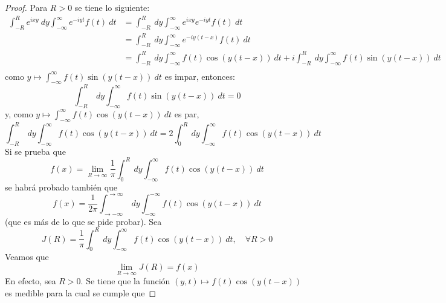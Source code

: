 \documentclass[12pt]{report}
\theoremstyle{largebreak}
\begin{document}
    \begin{proof}
        Para $R>0$ se tiene lo siguiente:
        \begin{equation*}
            \begin{split}
                \int_{ -R}^{ R}e^{ixy}\:dy\int_{-\infty}^\infty e^{ -iyt}f(t)\:dt&=\int_{ -R}^{ R}\:dy\int_{-\infty}^\infty e^{ixy}e^{ -iyt}f(t)\:dt\\
                &=\int_{ -R}^{ R}\:dy\int_{-\infty}^\infty e^{ -iy(t-x)}f(t)\:dt\\
                &=\int_{ -R}^{ R}\:dy\int_{-\infty}^\infty f(t)\cos(y(t-x))\:dt+i\int_{ -R}^{ R}\:dy\int_{-\infty}^\infty f(t)\sin(y(t-x))\:dt\\
            \end{split}
        \end{equation*}
        como $y\mapsto\int_{-\infty}^\infty f(t)\sin(y(t-x))\:dt$ es impar, entonces:
        \begin{equation*}
            \int_{ -R}^{ R}\:dy\int_{-\infty}^\infty f(t)\sin(y(t-x))\:dt=0
        \end{equation*}
        y, como $y\mapsto\int_{-\infty}^\infty f(t)\cos(y(t-x))\:dt$ es par,
        \begin{equation*}
            \int_{ -R}^{ R}\:dy\int_{-\infty}^\infty f(t)\cos(y(t-x))\:dt=2\int_{0}^{ R}\:dy\int_{-\infty}^\infty f(t)\cos(y(t-x))\:dt
        \end{equation*}
        Si se prueba que
        \begin{equation*}
            f(x)=\lim_{ R\rightarrow\infty}\frac{1}{\pi}\int_{0}^{ R}\:dy\int_{-\infty}^\infty f(t)\cos(y(t-x))\:dt
        \end{equation*}
        se habrá probado también que
        \begin{equation*}
            f(x)=\frac{1}{2\pi}\int_{ \rightarrow-\infty}^{\rightarrow\infty}\:dy\int_{ -\infty}^{ -\infty}f(t)\cos(y(t-x))\:dt
        \end{equation*}
        (que es más de lo que se pide probar). Sea
        \begin{equation*}
            J(R)=\frac{1}{\pi}\int_0^R\:dy\int_{-\infty}^\infty f(t)\cos(y(t-x))\:dt,\quad\forall R>0
        \end{equation*}
        Veamos que
        \begin{equation*}
            \lim_{ R\rightarrow\infty}J(R)=f(x)
        \end{equation*}
        En efecto, sea $R>0$. Se tiene que la función $(y,t)\mapsto f(t)\cos(y(t-x))$ es medible para la cual se cumple que

\end{proof}
\end{document}
